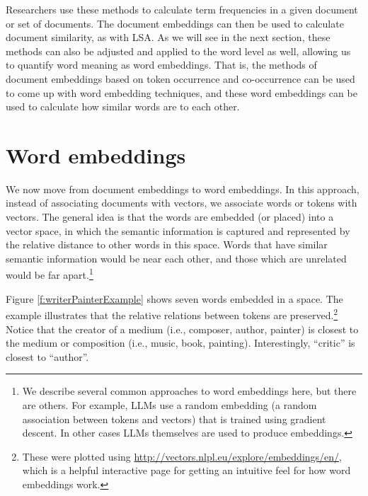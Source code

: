 Researchers use these methods to calculate term frequencies in a given document or set of documents. The document embeddings can then be used to calculate document similarity, as with LSA. As we will see in the next section, these methods can also be adjusted and applied to the word level as well, allowing us to quantify word meaning as word embeddings. That is, the methods of document embeddings based on token occurrence and co-occurrence can be used to come up with word embedding techniques, and these word embeddings can be used to calculate how similar words are to each other.

\section{Word embeddings}

We now move from document embeddings to word embeddings. In this approach, instead of associating documents with vectors, we associate words or tokens with vectors. 
The general idea is that the words are embedded (or placed) into a vector space, in which the semantic information is captured and represented by the relative distance to other words in this space. Words that have similar semantic information would be near each other, and those which are unrelated would be far apart.\footnote{We describe several common approaches to word embeddings here, but there are others. For example, LLMs use a random embedding (a random association between tokens and vectors) that is trained using gradient descent. In other cases LLMs themselves are used to produce embeddings.}

Figure \ref{f:writerPainterExample} shows seven words embedded in a space. The example illustrates that the relative relations between tokens are preserved.\footnote{These were plotted using \url{http://vectors.nlpl.eu/explore/embeddings/en/}, which is a helpful interactive page for getting an intuitive feel for how word embeddings work.}  Notice that the creator of a medium (i.e., composer, author, painter) is closest to the medium or composition (i.e., music, book, painting). Interestingly, ``critic'' is closest to ``author''.

